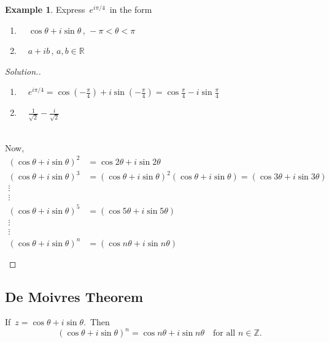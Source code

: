 \documentclass[11pt,a4paper]{article}
\theoremstyle{definition}
\newtheorem{example}[thm]{Example}
\newenvironment{solution}
  {\renewcommand{\qedsymbol}{}\begin{proof}[\textit{Solution}.]}
  {\end{proof}}
\begin{document}
\begin{example}

Express $\,\displaystyle{e^{i\pi / 4}\,}$ in the form
\begin{enumerate}
\item $\quad  \cos \theta + i\sin \theta \,, \,  -\pi < \theta < \pi$

\item $\quad  a + ib\,, \, a,b\in \mathbb{R}$\\
\end{enumerate}
\end{example}
\begin{solution}

\begin{enumerate}
\item $\quad  \displaystyle{e^{i\pi/4} = \cos \left(-\frac{\pi}{4}\right) + i\sin \left(-\frac{\pi}{4}\right) = \cos \frac{\pi}{4} - i\sin \frac{\pi}{4}}$\\

\item $\quad  \frac{1}{\sqrt{2}} - \frac{i}{\sqrt{2}}$\\\\
\end{enumerate}





Now,
\begin{align*}
\left(\cos \theta + i \sin \theta\right)^2 & = \cos 2 \theta + i \sin 2\theta\\
\left(\cos \theta + i \sin \theta\right)^3 & = \left(\cos \theta + i \sin \theta\right)^2\left(\cos \theta + i \sin \theta\right)= \left(\cos 3 \theta + i \sin 3\theta\right)\\
\vdots & \\
\vdots & \\
\left(\cos \theta + i \sin \theta\right)^5 & = \left(\cos 5\theta + i \sin 5\theta\right)\\
\vdots\\
\vdots\\
\left(\cos \theta + i \sin \theta\right)^n & = \left(\cos n\theta + i \sin n\theta\right)\\\\
\end{align*}
\end{solution}
\subsection{De Moivres Theorem}
If $\, z = \cos \theta + i\sin \theta.\,$ Then
$$\left(\cos \theta + i \sin \theta\right)^n  = \cos n\theta + i \sin n\theta
\quad \text{for all } n \in \mathbb{Z}.$$
\end{document}
